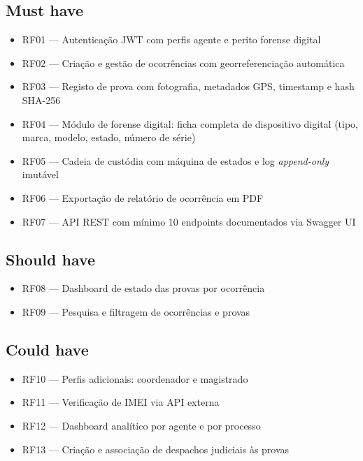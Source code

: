 \documentclass[a4paper,11pt]{article}
\begin{document}
\subsection*{Must have}

\begin{itemize}[nosep, leftmargin=*]
    \item RF01 --- Autenticação JWT com perfis agente e perito forense digital
    \item RF02 --- Criação e gestão de ocorrências com georreferenciação automática
    \item RF03 --- Registo de prova com fotografia, metadados GPS, timestamp e hash SHA-256
    \item RF04 --- Módulo de forense digital: ficha completa de dispositivo digital
                   (tipo, marca, modelo, estado, número de série)
    \item RF05 --- Cadeia de custódia com máquina de estados e log \emph{append-only} imutável
    \item RF06 --- Exportação de relatório de ocorrência em PDF
    \item RF07 --- API REST com mínimo 10 endpoints documentados via Swagger UI
\end{itemize}

\subsection*{Should have}

\begin{itemize}[nosep, leftmargin=*]
    \item RF08 --- Dashboard de estado das provas por ocorrência
    \item RF09 --- Pesquisa e filtragem de ocorrências e provas
\end{itemize}

\subsection*{Could have}

\begin{itemize}[nosep, leftmargin=*]
    \item RF10 --- Perfis adicionais: coordenador e magistrado
    \item RF11 --- Verificação de IMEI via API externa
    \item RF12 --- Dashboard analítico por agente e por processo
    \item RF13 --- Criação e associação de despachos judiciais às provas
\end{itemize}
\end{document}
